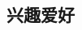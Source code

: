 \documentclass[11pt,a4paper,sans]{moderncv}   %
\begin{document}
\begin{CJK}{UTF8}{gbsn}
\section{兴趣爱好}
\renewcommand{\listitemsymbol}{-~}            %



\nocite{*}



\clearpage\end{CJK}
\end{document}
